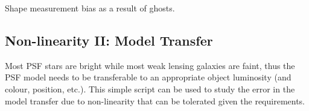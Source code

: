 \documentclass[a4paper,11pt,english]{sphinxmanual}
\begin{document}

\begin{fulllineitems}
\label{reduction:analysis.analyseGhosts.plotGhostContribution}
\end{fulllineitems}


\begin{fulllineitems}
\label{reduction:analysis.analyseGhosts.plotGhostContributionElectrons}
\end{fulllineitems}


\begin{fulllineitems}
\label{reduction:analysis.analyseGhosts.shapeMeasurement}
Shape measurement bias as a result of ghosts.

\end{fulllineitems}

\label{reduction:module-analysis.nonlinearityModelTransfer}

\subsection{Non-linearity II: Model Transfer}
\label{reduction:non-linearity-ii-model-transfer}
Most PSF stars are bright while most weak lensing galaxies are faint,
thus the PSF model needs to be transferable to an appropriate object luminosity (and colour, position, etc.).
This simple script can be used to study the error in the model transfer due to non-linearity that can be
tolerated given the requirements.
\end{document}

